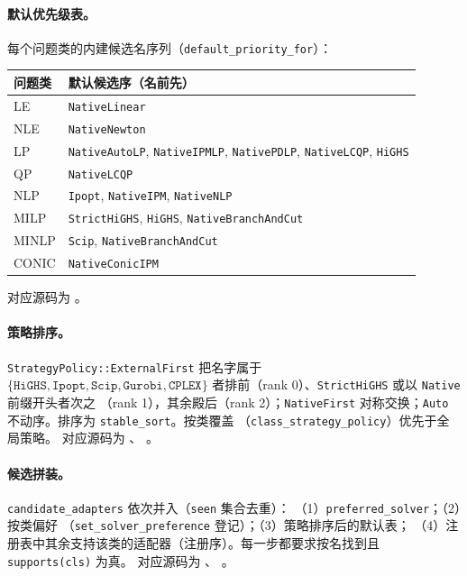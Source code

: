\paragraph{默认优先级表。}
每个问题类的内建候选名序列（\texttt{default\_priority\_for}）：
\begin{center}
\small
\begin{tabular}{ll}
\toprule
问题类 & 默认候选序（名前先）\\
\midrule
LE & \texttt{NativeLinear}\\
NLE & \texttt{NativeNewton}\\
LP & \texttt{NativeAutoLP}, \texttt{NativeIPMLP}, \texttt{NativePDLP},
     \texttt{NativeLCQP}, \texttt{HiGHS}\\
QP & \texttt{NativeLCQP}\\
NLP & \texttt{Ipopt}, \texttt{NativeIPM}, \texttt{NativeNLP}\\
MILP & \texttt{StrictHiGHS}, \texttt{HiGHS}, \texttt{NativeBranchAndCut}\\
MINLP & \texttt{Scip}, \texttt{NativeBranchAndCut}\\
CONIC & \texttt{NativeConicIPM}\\
\bottomrule
\end{tabular}
\end{center}
对应源码为
。

\paragraph{策略排序。}
\texttt{StrategyPolicy::ExternalFirst} 把名字属于
$\{\texttt{HiGHS},\texttt{Ipopt},\texttt{Scip},\texttt{Gurobi},\texttt{CPLEX}\}$
者排前（rank 0）、\texttt{StrictHiGHS} 或以 \texttt{Native} 前缀开头者次之
（rank 1），其余殿后（rank 2）；\texttt{NativeFirst} 对称交换；\texttt{Auto}
不动序。排序为 \texttt{stable\_sort}。按类覆盖
（\texttt{class\_strategy\_policy}）优先于全局策略。
对应源码为
、
。

\paragraph{候选拼装。}
\texttt{candidate\_adapters} 依次并入（\texttt{seen} 集合去重）：
（1）\texttt{preferred\_solver}；（2）按类偏好
（\texttt{set\_solver\_preference} 登记）；（3）策略排序后的默认表；
（4）注册表中其余支持该类的适配器（注册序）。每一步都要求按名找到且
\texttt{supports(cls)} 为真。
对应源码为
、
。


